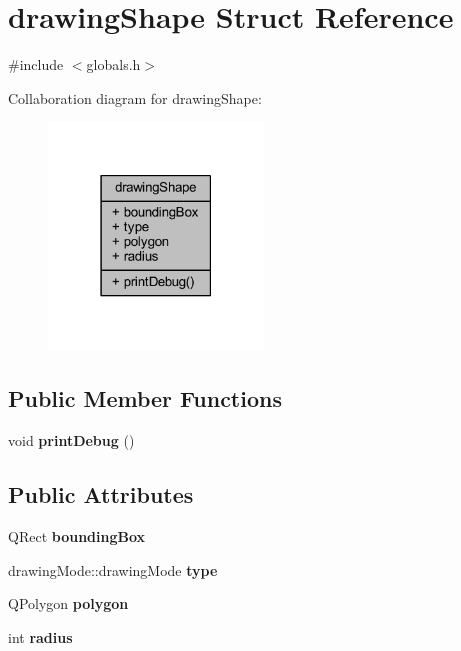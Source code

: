 \hypertarget{structdrawing_shape}{}\section{drawing\+Shape Struct Reference}
\label{structdrawing_shape}


{\ttfamily \#include $<$globals.\+h$>$}



Collaboration diagram for drawing\+Shape\+:
\nopagebreak
\begin{figure}[H]
\begin{center}
\leavevmode
\includegraphics[width=162pt]{structdrawing_shape__coll__graph}
\end{center}
\end{figure}
\subsection*{Public Member Functions}
\begin{DoxyCompactItemize}
\item 
\mbox{\label{structdrawing_shape_ad8778d93fedbd79a2ae09fa26bf73a63}} 
void {\bfseries print\+Debug} ()
\end{DoxyCompactItemize}
\subsection*{Public Attributes}
\begin{DoxyCompactItemize}
\item 
\mbox{\label{structdrawing_shape_a74c409162ad339b0475ece5f15d6f043}} 
Q\+Rect {\bfseries bounding\+Box}
\item 
\mbox{\label{structdrawing_shape_af3c271d20fd62c4e619d1ff7390b63e8}} 
drawing\+Mode\+::drawing\+Mode {\bfseries type}
\item 
\mbox{\label{structdrawing_shape_a3aae768e541c892d7b03e935ecd0b2b9}} 
Q\+Polygon {\bfseries polygon}
\item 
\mbox{\label{structdrawing_shape_a0dba9c87b530e092a592eeaa49afc21d}} 
int {\bfseries radius}
\end{DoxyCompactItemize}


